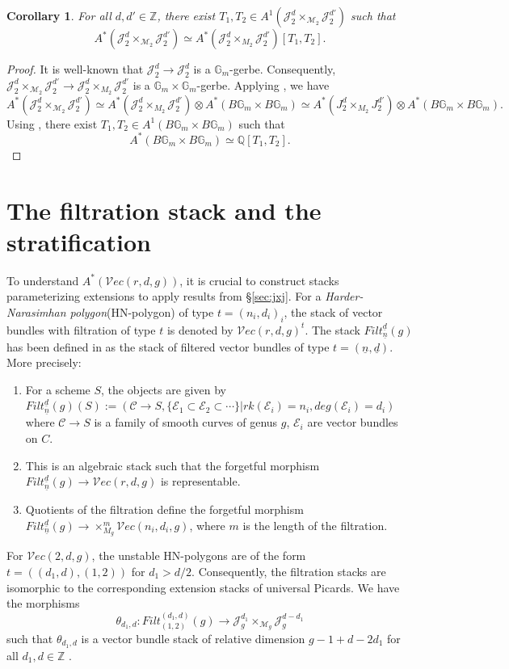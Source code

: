 \documentclass[11pt]{amsart}
\newcommand\Z{\mathbb{Z}}
\numberwithin{theorem}{section}
\newtheorem{corollary}{Corollary}[section]
\numberwithin{lemma}{section}
\theoremstyle{definition}
\newcommand{\ri}{\rightarrow}
\newcommand{\J}{\mathscr{J}}
\newcommand{\jac}{\mathcal{J}}
\newcommand{\ve}{\mathcal{V}ec}
\newcommand{\e}{\mathcal{E}}
\newcommand{\Q}{\mathbb{Q}}
\newcommand{\C}{\mathscr{C}}
\newcommand{\ext}{Filt}
\begin{document}
\begin{corollary}\label{cor:gerbe-jxj}
For all $d,d'\in \mathbb{Z}$, there exist $T_1,T_2\in A^1(\J^d_2\times_{\mathcal{M}_2}\J^{d'}_2)$ such that
$$A^*(\J^d_2\times_{\mathcal{M}_2}\J^{d'}_2)\simeq A^*(\jac^d_2\times_{M_2}\jac^{d'}_2)[T_1,T_2].$$
\end{corollary}
\begin{proof}
It is well-known that $\J^d_2\ri\jac^d_2$ is a $\mathbb{G}_m$-gerbe. 
Consequently, $\J^d_2\times_{\mathcal{M}_2}\J^{d'}_2\ri \jac^d_2\times_{M_2}\jac^{d'}_2$ is a $\mathbb{G}_m\times \mathbb{G}_m$-gerbe.
Applying \cite[Lemma 3.1.1.8]{lieblich}, we have
$$A^*(\J^d_2\times_{\mathcal{M}_2}\J^{d'}_2)\simeq A^*(\jac^d_2\times_{M_2}\jac^{d'}_2)\otimes A^*(B\mathbb{G}_m\times B\mathbb{G}_m)\simeq A^*(J^d_2\times_{M_2}J^{d'}_2)\otimes A^*(B\mathbb{G}_m\times B\mathbb{G}_m).$$
Using \cite[Example 4.3]{heinloth}, there exist $T_1,T_2\in A^1(B\mathbb{G}_m\times B\mathbb{G}_m)$ such that
$$A^*(B\mathbb{G}_m\times B\mathbb{G}_m)\simeq \Q[T_1,T_2].$$
\end{proof}
\section{The filtration stack and the stratification}
To understand $A^*(\ve(r,d,g))$, it is crucial to construct stacks parameterizing extensions to apply results from \S\ref{sec:jxj}.
For a \textit{Harder-Narasimhan polygon}(HN-polygon) of type $t = (n_i,d_i)_i$, the stack of vector bundles with filtration of type $t$ is denoted by $\ve(r,d,g)^t$.
The stack $\ext^{\underline{d}}_{\underline{n}}(g)$ has been defined in \cite[Lecture 5]{heinloth} as the stack of filtered vector bundles of type ${t} = (\underline{n},\underline{d})$.
More precisely:
\begin{enumerate}
	\item For a scheme $S$, the objects are given by $\ext^{\underline{d}}_{\underline{n}}(g)(S):= (\C\ri S, \{\e_1\subset \e_2\subset\cdots\}| rk(\e_i) = n_i, deg(\e_i) = d_i)$ where $\C\ri S$ is a family of smooth curves of genus $g$, $\e_i$ are vector bundles on $C$. 
	\item This is an algebraic stack such that the forgetful morphism $\ext^{\underline{d}}_{\underline{n}}(g)\ri \ve(r,d,g)$ is representable.
\item Quotients of the filtration define the forgetful morphism $\ext^{\underline{d}}_{\underline{n}}(g)\ri \times_{M_g}^m\ve(n_i,d_i,g)$, where $m$ is the length of the filtration.
\end{enumerate}
For $\ve(2,d,g)$, the unstable HN-polygons are of the form $t = ((d_1,d),(1,2))$ for $d_1>d/2$. 
Consequently, the filtration stacks are isomorphic to the corresponding extension stacks of universal Picards. We have the morphisms
$$\theta_{d_1,d}:\ext^{(d_1,d)}_{(1,2)}(g)\ri\J^{d_1}_g\times_{\mathcal{M}_g}\J^{d-d_1}_g$$ 
such that $\theta_{{d_1},d}$ is a vector bundle stack of relative dimension $g-1+d-2d_1$ for all $d_1,d\in \Z$ \cite[Corollary 3.2]{prada}.
\end{document}
